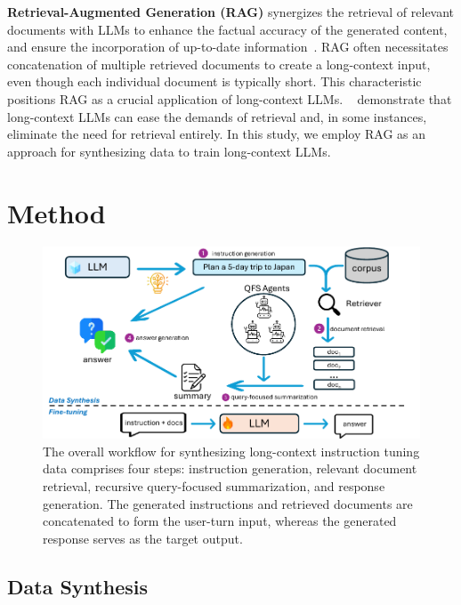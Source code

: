 \documentclass{article}
\begin{document}
\noindent
\textbf{Retrieval-Augmented Generation (RAG)}
synergizes the retrieval of relevant documents with LLMs to enhance the factual accuracy of the generated content,
and ensure the incorporation of up-to-date information~\citep{lewis2020retrieval,Karpukhin2020DensePR}.
RAG often necessitates concatenation of multiple retrieved documents to create a long-context input,
even though each individual document is typically short.
This characteristic positions RAG as a crucial application of long-context LLMs.
~\citeauthor{jiang2024longrag,lee2024can} demonstrate that long-context LLMs can ease the demands of retrieval and,
in some instances,
eliminate the need for retrieval entirely.
In this study,
we employ RAG as an approach for synthesizing data to train long-context LLMs.

\section{Method}

\begin{figure}[ht]
\centering
\includegraphics[width=1.0\textwidth]{agent_workflow.pdf}
\caption{The overall workflow for synthesizing long-context instruction tuning data comprises four steps:
instruction generation, relevant document retrieval, recursive query-focused summarization, and response generation.
The generated instructions and retrieved documents are concatenated to form the user-turn input,
whereas the generated response serves as the target output.}
\label{fig:workflow}
\end{figure}

\subsection{Data Synthesis}
\end{document}
